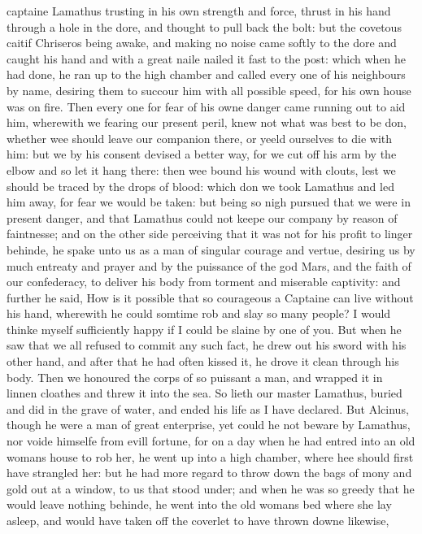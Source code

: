 captaine Lamathus trusting in his own strength and force, thrust in his hand
through a hole in the dore, and thought to pull back the bolt: but the covetous
caitif Chriseros being awake, and making no noise came softly to the dore and
caught his hand and with a great naile nailed it fast to the post: which when
he had done, he ran up to the high chamber and called every one of his
neighbours by name, desiring them to succour him with all possible speed, for
his own house was on fire. Then every one for fear of his owne danger came
running out to aid him, wherewith we fearing our present peril, knew not what
was best to be don, whether wee should leave our companion there, or yeeld
ourselves to die with him: but we by his consent devised a better way, for we
cut off his arm by the elbow and so let it hang there: then wee bound his wound
with clouts, lest we should be traced by the drops of blood: which don we took
Lamathus and led him away, for fear we would be taken: but being so nigh
pursued that we were in present danger, and that Lamathus could not keepe our
company by reason of faintnesse; and on the other side perceiving that it was
not for his profit to linger behinde, he spake unto us as a man of singular
courage and vertue, desiring us by much entreaty and prayer and by the
puissance of the god Mars, and the faith of our confederacy, to deliver his
body from torment and miserable captivity: and further he said, How is it
possible that so courageous a Captaine can live without his hand, wherewith he
could somtime rob and slay so many people? I would thinke myself sufficiently
happy if I could be slaine by one of you. But when he saw that we all refused
to commit any such fact, he drew out his sword with his other hand, and after
that he had often kissed it, he drove it clean through his body. Then we
honoured the corps of so puissant a man, and wrapped it in linnen cloathes and
threw it into the sea. So lieth our master Lamathus, buried and did in the
grave of water, and ended his life as I have declared. But Alcinus, though he
were a man of great enterprise, yet could he not beware by Lamathus, nor voide
himselfe from evill fortune, for on a day when he had entred into an old womans
house to rob her, he went up into a high chamber, where hee should first have
strangled her: but he had more regard to throw down the bags of mony and gold
out at a window, to us that stood under; and when he was so greedy that he
would leave nothing behinde, he went into the old womans bed where she lay
asleep, and would have taken off the coverlet to have thrown downe likewise,
